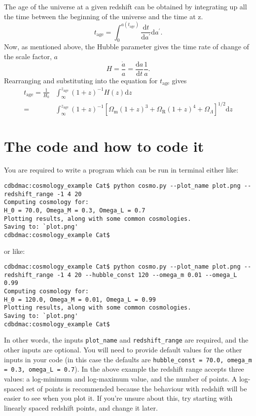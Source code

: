 \documentclass[]{article}
\begin{document}
The age of the universe at a given redshift can be obtained by integrating up all the time between the beginning of the universe and the time at z. 
\begin{equation}
t_\mathrm{age} = \int_0^{a(t_\mathrm{age})} \frac{\mathrm{d}t}{\mathrm{d}a^\prime} \mathrm{d}a^\prime.
\end{equation}
Now, as mentioned above, the Hubble parameter gives the time rate of change of the scale factor, $a$
\begin{equation}
H = \frac{\dot a}{a} = \frac{\mathrm{d}a}{\mathrm{d}t}\frac{1}{a}.
\end{equation}
Rearranging and substituting into the equation for $t_\mathrm{age}$ gives 
\begin{equation}
\boxed{
\begin{split} 
t_\mathrm{age} = \frac{1}{H_0} &\int_\infty^{z_\mathrm{age}} (1+z)^{-1} H(z) \mathrm{d}z\\
= &\int_\infty^{z_\mathrm{age}} (1+z)^{-1} [\Omega_\mathrm{m} (1+z)^{3}+\Omega_\mathrm{R} (1+z)^{4}+\Omega_\Lambda]^{1/2} \mathrm{d}z
\end{split}
}
\label{eq:tage}
\end{equation}

\section{The code and how to code it}
\label{sec:code}

You are required to write a program which can be run in terminal either like:
\begin{lstlisting}
cdbdmac:cosmology_example Cat$ python cosmo.py --plot_name plot.png --redshift_range -1 4 20
Computing cosmology for:
H_0 = 70.0, Omega_M = 0.3, Omega_L = 0.7
Plotting results, along with some common cosmologies. 
Saving to: `plot.png'
cdbdmac:cosmology_example Cat$
\end{lstlisting}
or like:
\begin{lstlisting}
cdbdmac:cosmology_example Cat$ python cosmo.py --plot_name plot.png --redshift_range -1 4 20 --hubble_const 120 --omega_m 0.01 --omega_L 0.99
Computing cosmology for:
H_0 = 120.0, Omega_M = 0.01, Omega_L = 0.99
Plotting results, along with some common cosmologies. 
Saving to: `plot.png'
cdbdmac:cosmology_example Cat$
\end{lstlisting}
In other words, the inputs \texttt{plot\_name} and \texttt{redshift\_range} are required, and the other inputs are optional. You will need to provide default values for the other inputs in your code (in this case the defaults are \texttt{hubble\_const = 70.0, omega\_m = 0.3, omega\_L = 0.7}). In the above example the redshift range accepts three values: a log-minimum and log-maximum value, and the number of points. A log-spaced set of points is recommended because the behaviour with redshift will be easier to see when you plot it. If you're unsure about this, try starting with linearly spaced redshift points, and change it later.\\
\end{document}
